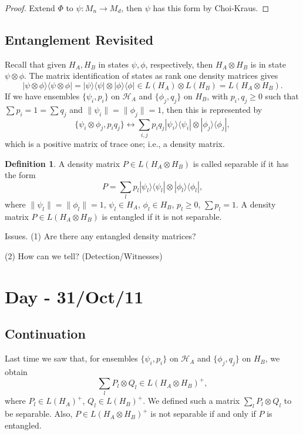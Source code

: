 \documentclass[12pt]{article}
\theoremstyle{definition}
\newtheorem*{definition}{Definition}
\begin{document}
\begin{proof}
Extend $\Phi$ to $\psi:M_n \to M_d$, then $\psi$ has this form by Choi-Kraus.
\end{proof}

\subsection{Entanglement Revisited}

Recall that given $H_A,H_B$ in states $\psi,\phi$, respectively, then $H_A \otimes H_B$ is in state $\psi \otimes \phi$. The matrix identification of states as rank one density matrices gives
\[
|\psi \otimes \phi\rangle\langle \psi \otimes \phi| = |\psi\rangle\langle \psi| \otimes |\phi\rangle\langle \phi| \in L(H_A) \otimes L(H_B)=L(H_A \otimes H_B).
\]
If we have ensembles $\{\psi_i,p_i\}$ on $\mathcal{H}_A$ and $\{\phi_j,q_j\}$ on $H_B$, with $p_i,q_j \geq 0$ such that $\sum p_i = 1 = \sum q_j$ and $\|\psi_i\|=\|\phi_j\|=1$, then this is represented by
\[
\{\psi_i \otimes \phi_j,p_iq_j\} \leftrightarrow \sum_{i,j} p_iq_j |\psi_i\rangle\langle \psi_i| \otimes |\phi_j\rangle\langle \phi_j|,
\]
which is a positive matrix of trace one; i.e., a density matrix.

\begin{definition}
A density matrix $P \in L(H_A \otimes H_B)$ is called separable if it has the form
\[
P=\sum_l p_l |\psi_l\rangle\langle \psi_l| \otimes |\phi_l\rangle\langle \phi_l|,
\]
where $\|\psi_l\|=\|\phi_l\|=1$, $\psi_l \in H_A$, $\phi_l \in H_B$, $p_l \geq 0$, $\sum p_l=1$.
A density matrix $P \in L(H_A \otimes H_B)$ is entangled if it is not separable.
\end{definition}

Issues. (1) Are there any entangled density matrices?

(2) How can we tell? (Detection/Witnesses)

\section{Day - 31/Oct/11}

\subsection{Continuation}

Last time we saw that, for ensembles $\{\psi_i,p_i\}$ on $\mathcal{H}_A$ and $\{\phi_j,q_j\}$ on $H_B$, we obtain
\[
\sum_l P_l \otimes Q_l \in L(H_A \otimes H_B)^+,
\]
where $P_l \in L(H_A)^+$, $Q_l \in L(H_B)^+$. We defined such a matrix $\sum_l P_l \otimes Q_l$ to be separable. Also, $P \in L(H_A \otimes H_B)^+$ is not separable if and only if $P$ is entangled.
\end{document}
